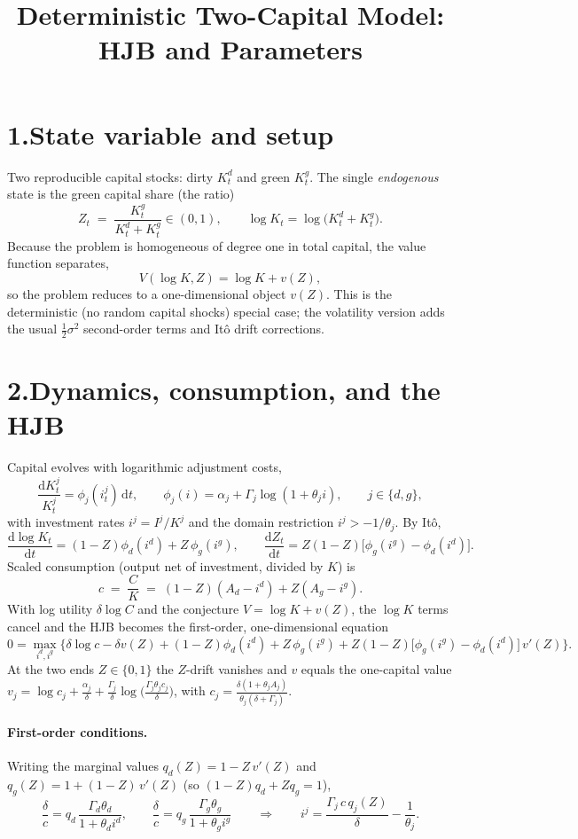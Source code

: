 \documentclass[11pt]{article}
\title{Deterministic Two-Capital Model: HJB and Parameters}
\author{}
\date{}
\newcommand{\dd}{\mathrm{d}}
\begin{document}
\maketitle
\vspace{-3em}

\section*{1.\quad State variable and setup}

Two reproducible capital stocks: dirty $K^d_t$ and green $K^g_t$. The single
\emph{endogenous} state is the green capital share (the ratio)
\[
Z_t \;=\; \frac{K^g_t}{K^d_t+K^g_t}\in(0,1),
\qquad \log K_t=\log\!\big(K^d_t+K^g_t\big).
\]
Because the problem is homogeneous of degree one in total capital, the value
function separates,
\[
V(\log K,Z)=\log K + v(Z),
\]
so the problem reduces to a one-dimensional object $v(Z)$. This is the
deterministic (no random capital shocks) special case; the volatility version
adds the usual $\tfrac12\sigma^2$ second-order terms and It\^o drift corrections.

\section*{2.\quad Dynamics, consumption, and the HJB}

Capital evolves with logarithmic adjustment costs,
\[
\frac{\dd K^j_t}{K^j_t}=\phi_j(i^j_t)\,\dd t,\qquad
\phi_j(i)=\alpha_j+\Gamma_j\log(1+\theta_j i),\qquad j\in\{d,g\},
\]
with investment rates $i^j=I^j/K^j$ and the domain restriction $i^j>-1/\theta_j$.
By It\^o,
\[
\frac{\dd \log K_t}{\dd t}=(1-Z)\phi_d(i^d)+Z\,\phi_g(i^g),\qquad
\frac{\dd Z_t}{\dd t}=Z(1-Z)\big[\phi_g(i^g)-\phi_d(i^d)\big].
\]
Scaled consumption (output net of investment, divided by $K$) is
\[
c \;=\; \frac{C}{K}\;=\;(1-Z)(A_d-i^d)+Z(A_g-i^g).
\]
With log utility $\delta\log C$ and the conjecture $V=\log K+v(Z)$, the $\log K$
terms cancel and the HJB becomes the first-order, one-dimensional equation
\[
0=\max_{i^d,i^g}\Big\{\delta\log c-\delta v(Z)
+(1-Z)\phi_d(i^d)+Z\,\phi_g(i^g)
+Z(1-Z)\big[\phi_g(i^g)-\phi_d(i^d)\big]\,v'(Z)\Big\}.
\]
At the two ends $Z\in\{0,1\}$ the $Z$-drift vanishes and $v$ equals the
one-capital value $v_j=\log c_j+\tfrac{\alpha_j}{\delta}
+\tfrac{\Gamma_j}{\delta}\log\!\big(\tfrac{\Gamma_j\theta_j c_j}{\delta}\big)$,
with $c_j=\tfrac{\delta(1+\theta_j A_j)}{\theta_j(\delta+\Gamma_j)}$.

\paragraph{First-order conditions.}
Writing the marginal values $q_d(Z)=1-Z\,v'(Z)$ and $q_g(Z)=1+(1-Z)\,v'(Z)$
(so $(1-Z)q_d+Zq_g=1$),
\[
\frac{\delta}{c}=q_d\,\frac{\Gamma_d\theta_d}{1+\theta_d i^d},
\qquad
\frac{\delta}{c}=q_g\,\frac{\Gamma_g\theta_g}{1+\theta_g i^g}
\qquad\Longrightarrow\qquad
i^j=\frac{\Gamma_j\,c\,q_j(Z)}{\delta}-\frac{1}{\theta_j}.
\]
\end{document}
